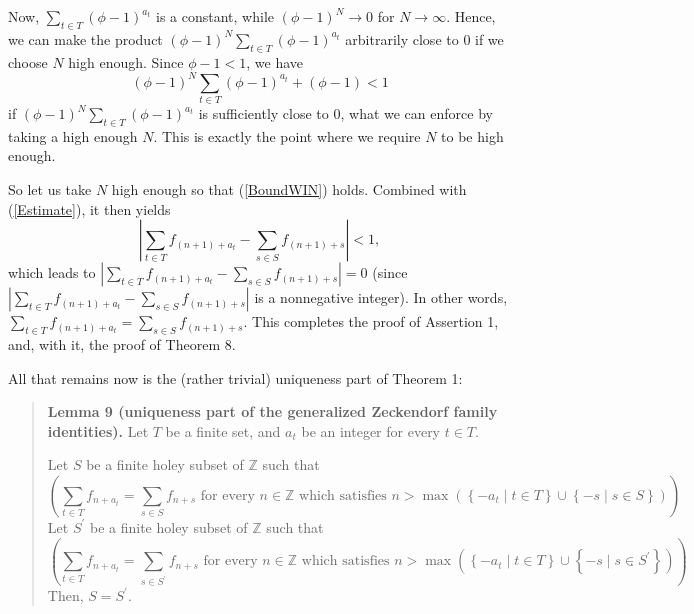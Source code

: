 \documentclass[12pt,final,notitlepage,onecolumn]{article}%
\begin{document}
Now, $\sum\limits_{t\in T}\left(  \phi-1\right)  ^{a_{t}}$ is a constant,
while $\left(  \phi-1\right)  ^{N}\rightarrow0$ for $N\rightarrow\infty$.
Hence, we can make the product $\left(  \phi-1\right)  ^{N}\sum\limits_{t\in
T}\left(  \phi-1\right)  ^{a_{t}}$ arbitrarily close to $0$ if we choose $N$
high enough. Since $\phi-1<1$, we have%
\begin{equation}
\left(  \phi-1\right)  ^{N}\sum\limits_{t\in T}\left(  \phi-1\right)  ^{a_{t}%
}+\left(  \phi-1\right)  <1 \label{BoundWIN}%
\end{equation}
if $\left(  \phi-1\right)  ^{N}\sum\limits_{t\in T}\left(  \phi-1\right)
^{a_{t}}$ is sufficiently close to $0$, what we can enforce by taking a high
enough $N$. This is exactly the point where we require $N$ to be high enough.

So let us take $N$ high enough so that (\ref{BoundWIN}) holds. Combined with
(\ref{Estimate}), it then yields%
\[
\left\vert \sum\limits_{t\in T}f_{\left(  n+1\right)  +a_{t}}-\sum
\limits_{s\in S}f_{\left(  n+1\right)  +s}\right\vert <1,
\]
which leads to $\left\vert \sum\limits_{t\in T}f_{\left(  n+1\right)  +a_{t}%
}-\sum\limits_{s\in S}f_{\left(  n+1\right)  +s}\right\vert =0$ (since
$\left\vert \sum\limits_{t\in T}f_{\left(  n+1\right)  +a_{t}}-\sum
\limits_{s\in S}f_{\left(  n+1\right)  +s}\right\vert $ is a nonnegative
integer). In other words, $\sum\limits_{t\in T}f_{\left(  n+1\right)  +a_{t}%
}=\sum\limits_{s\in S}f_{\left(  n+1\right)  +s}$. This completes the proof of
Assertion 1, and, with it, the proof of Theorem 8.

All that remains now is the (rather trivial) uniqueness part of Theorem 1:

\begin{quote}
\textbf{Lemma 9 (uniqueness part of the generalized Zeckendorf family
identities).} Let $T$ be a finite set, and $a_{t}$ be an integer for every
$t\in T$.

Let $S$ be a finite holey subset of $\mathbb{Z}$ such that%
\[
\left(  \sum\limits_{t\in T}f_{n+a_{t}}=\sum\limits_{s\in S}f_{n+s}\text{ for
every }n\in\mathbb{Z}\text{ which satisfies }n>\max\left(  \left\{  -a_{t}\mid
t\in T\right\}  \cup\left\{  -s\mid s\in S\right\}  \right)  \right)  .
\]
Let $S^{\prime}$ be a finite holey subset of $\mathbb{Z}$ such that%
\[
\left(  \sum\limits_{t\in T}f_{n+a_{t}}=\sum\limits_{s\in S^{\prime}}%
f_{n+s}\text{ for every }n\in\mathbb{Z}\text{ which satisfies }n>\max\left(
\left\{  -a_{t}\mid t\in T\right\}  \cup\left\{  -s\mid s\in S^{\prime
}\right\}  \right)  \right)  .
\]
Then, $S=S^{\prime}$.
\end{quote}
\end{document}
